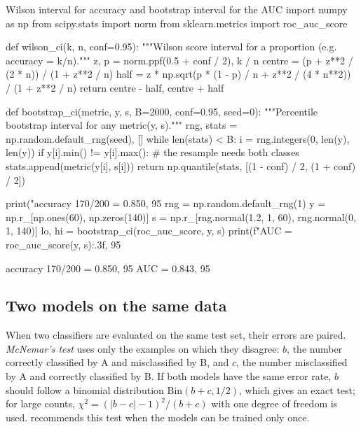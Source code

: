 \begin{pylisting}[label={lst:ci}]{Wilson interval for accuracy and bootstrap interval for the AUC}
import numpy as np
from scipy.stats import norm
from sklearn.metrics import roc_auc_score

def wilson_ci(k, n, conf=0.95):
    """Wilson score interval for a proportion (e.g. accuracy = k/n)."""
    z, p = norm.ppf(0.5 + conf / 2), k / n
    centre = (p + z**2 / (2 * n)) / (1 + z**2 / n)
    half = z * np.sqrt(p * (1 - p) / n + z**2 / (4 * n**2)) / (1 + z**2 / n)
    return centre - half, centre + half

def bootstrap_ci(metric, y, s, B=2000, conf=0.95, seed=0):
    """Percentile bootstrap interval for any metric(y, s)."""
    rng, stats = np.random.default_rng(seed), []
    while len(stats) < B:
        i = rng.integers(0, len(y), len(y))
        if y[i].min() != y[i].max():          # the resample needs both classes
            stats.append(metric(y[i], s[i]))
    return np.quantile(stats, [(1 - conf) / 2, (1 + conf) / 2])

print("accuracy 170/200 = 0.850, 95%
rng = np.random.default_rng(1)
y = np.r_[np.ones(60), np.zeros(140)]
s = np.r_[rng.normal(1.2, 1, 60), rng.normal(0, 1, 140)]
lo, hi = bootstrap_ci(roc_auc_score, y, s)
print(f"AUC = {roc_auc_score(y, s):.3f}, 95%
\end{pylisting}
\begin{pyoutput}
accuracy 170/200 = 0.850, 95%
AUC = 0.843, 95%
\end{pyoutput}

\subsection{Two models on the same data}

When two classifiers are evaluated on the same test set, their errors are paired. \emph{McNemar's
test} \citep{mcnemar1947note} uses only the examples on which they disagree: $b$, the number
correctly classified by A and misclassified by B, and $c$, the number misclassified by A and
correctly classified by B. If both models have the same error rate, $b$ should follow a binomial
distribution $\mathrm{Bin}(b+c,1/2)$, which gives an exact test; for large counts,
$\chi^2=(|b-c|-1)^2/(b+c)$ with one degree of freedom is used. \citet{dietterich1998approximate}
recommends this test when the models can be trained only once.

